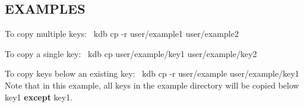\subsection*{E\+X\+A\+M\+P\+L\+ES}

To copy multiple keys\+:~\newline
 {\ttfamily kdb cp -\/r user/example1 user/example2}

To copy a single key\+:~\newline
 {\ttfamily kdb cp user/example/key1 user/example/key2}

To copy keys below an existing key\+:~\newline
 {\ttfamily kdb cp -\/r user/example user/example/key1}~\newline
 Note that in this example, all keys in the example directory will be copied below {\ttfamily key1} {\bfseries except} {\ttfamily key1}. 